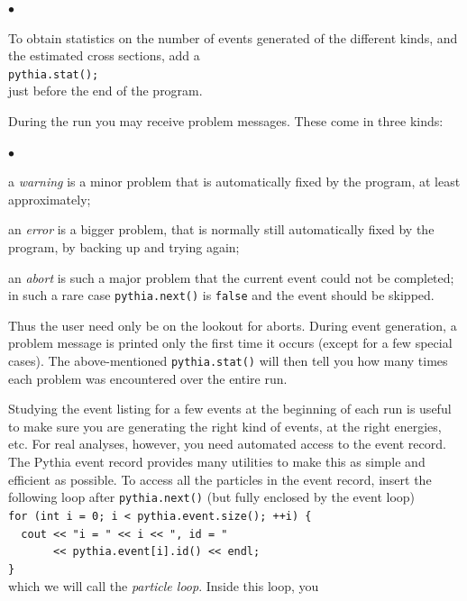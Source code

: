 \documentclass[12pt,a4paper]{article}
\newenvironment{Itemize}{\begin{list}{$\bullet$}%
{\setlength{\topsep}{0.4mm}\setlength{\partopsep}{0.4mm}%
\setlength{\itemsep}{0.4mm}\setlength{\parsep}{0.4mm}}}%
{\end{list}}
\begin{document}
\begin{Itemize}
\item To obtain statistics on the number of events generated of the 
different kinds, and the estimated cross sections, add a \\
\hspace*{10mm}\texttt{pythia.stat();}\\
just before the end of the program.
\item During the run you may receive problem messages. These come in
three kinds:
\begin{Itemize}
\item a \textit{warning} is a minor problem that is automatically fixed by 
the program, at least approximately;
\item an \textit{error} is a bigger problem, that is normally still 
automatically fixed by the program, by backing up and trying again;
\item an \textit{abort} is such a major problem that the current
 event could not be completed; in such a rare case \texttt{pythia.next()} 
is \texttt{false} and the event should be skipped.  
\end{Itemize}
Thus the user need only be on the lookout for aborts. During event
generation, a problem message is printed only the first time it occurs
(except for a few special cases). 
The above-mentioned \texttt{pythia.stat()} will then tell you how many
times each problem was encountered over the entire run.
\item Studying the event listing for a few events
at the beginning of each run is useful to make sure you are generating the
right kind of events, at the right energies, etc. For real analyses,
however, you need automated access to the event record. The Pythia event
record provides many utilities to make this as simple and efficient as
possible. To access all the particles in the event record, insert the
following loop after \texttt{pythia.next()} (but fully enclosed by the
event loop) \\
\hspace*{10mm}\texttt{for (int i = 0; i < pythia.event.size(); ++i) \{ }\\
\hspace*{10mm}\texttt{~~cout << "i = " << i << ", id = " }\\
\hspace*{10mm}\texttt{~~~~~~~<< pythia.event[i].id() << endl; }\\ 
\hspace*{10mm}\texttt{\} }\\
which we will call the \textit{particle loop}. Inside this loop, you

\end{Itemize}
\end{document}
